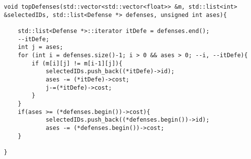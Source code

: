 \begin{lstlisting}
void topDefenses(std::vector<std::vector<float>> &m, std::list<int> &selectedIDs, std::list<Defense *> defenses, unsigned int ases){
    
    std::list<Defense *>::iterator itDefe = defenses.end();
    --itDefe; 
    int j = ases;
    for (int i = defenses.size()-1; i > 0 && ases > 0; --i, --itDefe){
        if (m[i][j] != m[i-1][j]){
            selectedIDs.push_back((*itDefe)->id);
            ases -= (*itDefe)->cost;
            j-=(*itDefe)->cost;
        }
    }
    if(ases >= (*defenses.begin())->cost){
            selectedIDs.push_back((*defenses.begin())->id);
            ases -= (*defenses.begin())->cost;
    }
    
}

\end{lstlisting}